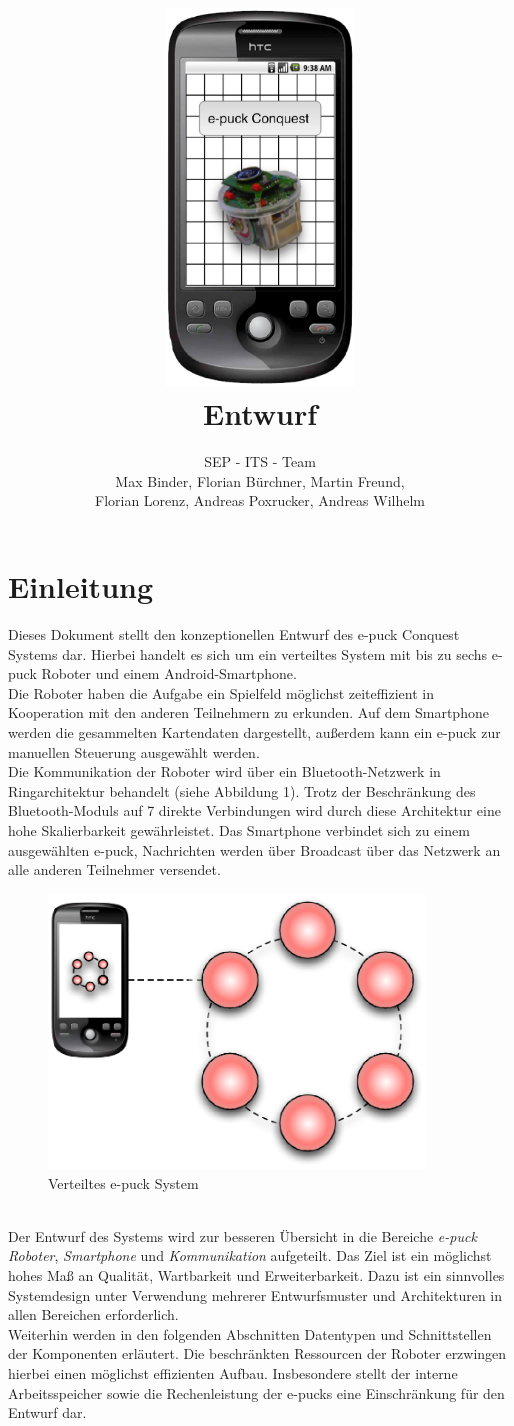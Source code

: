 \documentclass[10pt,a4paper]{article}
\title{
	\includegraphics[height=10cm]{logo.eps} \\
	\vspace{1cm}
	Entwurf
}
\author{SEP - ITS - Team \\ Max Binder, Florian Bürchner, Martin Freund, \\Florian Lorenz,
											Andreas Poxrucker, Andreas Wilhelm}
\let\oldsection\section
\renewcommand{\section}{\newpage \oldsection}
\begin{document}
	\maketitle
	\newpage
	\tableofcontents	
	\newpage

	\section{Einleitung}
		Dieses Dokument stellt den konzeptionellen Entwurf des e-puck Conquest Systems dar. Hierbei handelt es sich um ein
		verteiltes System mit bis zu sechs  e-puck Roboter und einem Android-Smartphone. \\
		Die Roboter haben die Aufgabe ein Spielfeld möglichst zeiteffizient in Kooperation mit den anderen Teilnehmern zu erkunden.
		Auf dem Smartphone werden die gesammelten Kartendaten dargestellt, außerdem kann ein e-puck zur manuellen Steuerung
		ausgewählt werden. \\
		Die Kommunikation der Roboter wird über ein Bluetooth-Netzwerk in Ringarchitektur behandelt (siehe Abbildung 1). Trotz
		der Beschränkung des Bluetooth-Moduls auf 7 direkte Verbindungen wird durch diese Architektur eine hohe Skalierbarkeit
		gewährleistet. Das Smartphone verbindet sich zu einem ausgewählten e-puck, Nachrichten werden über Broadcast über
		das Netzwerk an alle anderen Teilnehmer versendet.
		\begin{figure}[h]
			\centering
			\includegraphics[width=10cm]{images/system.eps}
  			\caption{Verteiltes e-puck System}
  		\end{figure} \\
		Der Entwurf des Systems wird zur besseren Übersicht in die Bereiche \textit{e-puck Roboter}, \textit{Smartphone} und
		\textit{Kommunikation} aufgeteilt. Das Ziel ist ein möglichst hohes Maß an	Qualität, Wartbarkeit und Erweiterbarkeit. Dazu ist
		ein sinnvolles Systemdesign unter Verwendung mehrerer Entwurfsmuster und Architekturen in allen Bereichen erforderlich. \\
		Weiterhin werden in den folgenden Abschnitten Datentypen und Schnittstellen der Komponenten erläutert. Die beschränkten
		Ressourcen der Roboter erzwingen hierbei einen möglichst effizienten Aufbau. Insbesondere stellt der interne
		Arbeitsspeicher sowie die Rechenleistung der e-pucks eine Einschränkung für den Entwurf dar.
				
\end{document}
